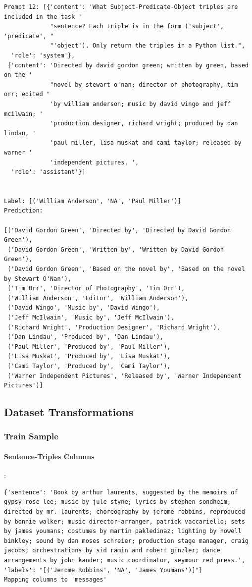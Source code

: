 \documentclass{article}
\begin{document}
\begin{lstlisting}
Prompt 12: [{'content': 'What Subject-Predicate-Object triples are included in the task '
             "sentence? Each triple is in the form ('subject', 'predicate', "
             "'object'). Only return the triples in a Python list.",
  'role': 'system'},
 {'content': 'Directed by david gordon green; written by green, based on the '
             "novel by stewart o'nan; director of photography, tim orr; edited "
             'by william anderson; music by david wingo and jeff mcilwain; '
             'production designer, richard wright; produced by dan lindau, '
             'paul miller, lisa muskat and cami taylor; released by warner '
             'independent pictures. ',
  'role': 'assistant'}]


Label: [('William Anderson', 'NA', 'Paul Miller')]
Prediction: 

[('David Gordon Green', 'Directed by', 'Directed by David Gordon Green'),
 ('David Gordon Green', 'Written by', 'Written by David Gordon Green'),
 ('David Gordon Green', 'Based on the novel by', 'Based on the novel by Stewart O'Nan'),
 ('Tim Orr', 'Director of Photography', 'Tim Orr'),
 ('William Anderson', 'Editor', 'William Anderson'),
 ('David Wingo', 'Music by', 'David Wingo'),
 ('Jeff McIlwain', 'Music by', 'Jeff McIlwain'),
 ('Richard Wright', 'Production Designer', 'Richard Wright'),
 ('Dan Lindau', 'Produced by', 'Dan Lindau'),
 ('Paul Miller', 'Produced by', 'Paul Miller'),
 ('Lisa Muskat', 'Produced by', 'Lisa Muskat'),
 ('Cami Taylor', 'Produced by', 'Cami Taylor'),
 ('Warner Independent Pictures', 'Released by', 'Warner Independent Pictures')]
\end{lstlisting}
\subsection{Dataset Transformations}\label{dataset_transform}
\subsubsection{Train Sample}
\paragraph{Sentence-Triples Columns}:
\begin{lstlisting}
{'sentence': 'Book by arthur laurents, suggested by the memoirs of gypsy rose lee; music by jule styne; lyrics by stephen sondheim; directed by mr. laurents; choreography by jerome robbins, reproduced by bonnie walker; music director-arranger, patrick vaccariello; sets by james youmans; costumes by martin pakledinaz; lighting by howell binkley; sound by dan moses schreier; production stage manager, craig jacobs; orchestrations by sid ramin and robert ginzler; dance arrangements by john kander; music coordinator, seymour red press.', 'labels': "[('Jerome Robbins', 'NA', 'James Youmans')]"}
Mapping columns to 'messages'
\end{lstlisting}
\end{document}
